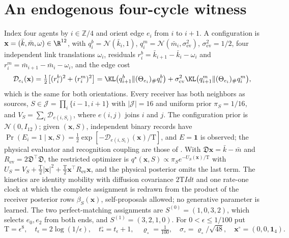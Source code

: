 \section{An endogenous four-cycle witness}
\label{sec:rg-formation-endogenous-cycle}

Index four agents by \(i\in\mathbb Z/4\) and orient edge \(e_i\) from \(i\) to
\(i+1\). A configuration is \(\mathbf x=(\bar k,\bar m,\omega)\in\R^{12}\), with
\(q_i^b=\mathcal N(\bar k_i,1)\), \(q_i^m=\mathcal N(\bar m_i,\sigma^2_{\mathrm{ev}})\),
\(\sigma^2_{\mathrm{ev}}=1/2\), four independent link translations
\(\omega_i\), residuals \(r^b_i=\bar k_{i+1}-\bar k_i-\omega_i\) and
\(r^m_i=\bar m_{i+1}-\bar m_i-\omega_i\), and the edge cost
\begin{equation}
\mathcal D_{e_i}(\mathbf x)=\tfrac12\bigl[(r^b_i)^2+(r^m_i)^2\bigr]
=\KL\bigl(q^b_{i+1}\Vert(\Theta_{e_i})_\#q^b_i\bigr)
+\sigma^2_{\mathrm{ev}}\KL\bigl(q^m_{i+1}\Vert(\Theta_{e_i})_\#q^m_i\bigr),
\label{eq:rg-formation-cycle-cost}
\end{equation}
which is the same for both orientations. Every receiver has both neighbors as
sources, \(S\in\mathcal J=\prod_i\{i-1,i+1\}\) with \(|\mathcal J|=16\) and
uniform prior \(\pi_S=1/16\), and \(V_S=\sum_i\mathcal D_{e(i,S_i)}\), where
\(e(i,j)\) joins \(i\) and \(j\). The configuration prior is
\(\mathcal N(0,I_{12})\); given \((\mathbf x,S)\), independent binary records
have \(\Pr(E_i=1\mid\mathbf x,S)=\tfrac12\exp[-\mathcal D_{e(i,S_i)}(\mathbf x)/\mathrm T]\),
and \(E=\mathbf 1\) is observed; the physical evaluator and recognition
coupling are those of . With
\(\mathfrak D\mathbf x=\bar k-\bar m\) and
\(R_{\mathrm{ev}}=2\mathfrak D^\top\mathfrak D\), the restricted optimizer is
\(q^\star(\mathbf x,S)\propto\pi_Se^{-U_S(\mathbf x)/\mathrm T}\) with
\(U_S=V_S+\tfrac{\mathrm T}2|\mathbf x|^2+\tfrac{\mathrm T}2\mathbf x^\top R_{\mathrm{ev}}\mathbf x\),
and the physical posterior omits the last term. The kinetics are identity
mobility with diffusion covariance \(2\mathrm TI dt\) and one rate-one clock
at which the complete assignment is redrawn from the product of the receiver
posterior rows \(\beta_S(\mathbf x)\), self-proposals allowed; no generative
parameter is learned. The two perfect-matching assignments are
\(S^{(0)}=(1,0,3,2)\), which selects \(e_0,e_2\) from both ends, and
\(S^{(1)}=(3,2,1,0)\). For \(0<\epsilon\le1/100\) put
\begin{equation}
\mathrm T=\epsilon^8,\quad t_\epsilon=2\log(1/\epsilon),\quad
t^\circ_*=t_\epsilon+1,\quad \varrho_\circ=\tfrac1{100},\quad
\sigma_\circ=\varrho_\circ/\sqrt{48},\quad \mathbf x^\circ=(0,0,\mathbf 1_4).
\label{eq:rg-formation-cycle-regime}
\end{equation}
